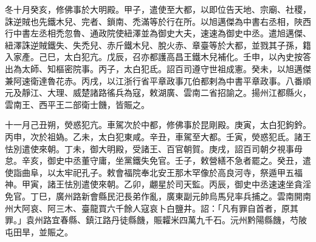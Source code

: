 \begin{pinyinscope}
 冬十月癸亥，修佛事於大明殿。甲子，遣使至大都，以即位告天地、宗廟、社稷，誅逆賊也先鐵木兒、完者、鎖南、禿滿等於行在所。以旭邁傑為中書右丞相，陜西行中書左丞相禿忽魯、通政院使紐澤並為御史大夫，速速為御史中丞。遣旭邁傑、紐澤誅逆賊鐵失、失禿兒、赤斤鐵木兒、脫火赤、章臺等於大都，並戮其子孫，籍入家產。己巳，太白犯亢。戊辰，召亦都護高昌王鐵木兒補化。壬申，以內史按答出為太師、知樞密院事。丙子，太白犯氐。詔百司遵守世祖成憲。癸未，以旭邁傑兼阿速衛達魯花赤。丙戌，以江浙行省平章政事兀伯都剌為中書平章政事。八番順元及靜江、大理、威楚諸路徭兵為寇，敕湖廣、雲南二省招諭之。揚州江都縣火，雲南王、西平王二部衛士饑，皆賑之。



 十一月己丑朔，熒惑犯亢。車駕次於中都，修佛事於昆剛殿。庚寅，太白犯鉤鈐。丙申，次於祖媯。乙未，太白犯東咸。辛丑，車駕至大都。壬寅，熒惑犯氐。諸王怯別遣使來朝。丁未，御大明殿，受諸王、百官朝賀。庚戌，詔百司朝夕視事毋怠。辛亥，御史中丞董守庸，坐黨鐵失免官。壬子，敕營繕不急者罷之。癸丑，遣使詣曲阜，以太牢祀孔子。敕會福院奉北安王那木罕像於高良河寺，祭遁甲五福神。甲寅，諸王怯別遣使來朝。乙卯，翽星於司天監。丙辰，御史中丞速速坐貪淫免官。丁巳，廣州路新會縣民汜長弟作亂，廣東副元帥烏馬兒率兵捕之。雲南開南州大阿哀、阿三木、臺龍買六千餘人寇哀卜白鹽井。詔：「凡有罪自首者，原其罪。」袁州路宜春縣、鎮江路丹徒縣饑，賑糶米四萬九千石。沅州黔陽縣饑，芍陂屯田旱，並賑之。




\end{pinyinscope}
